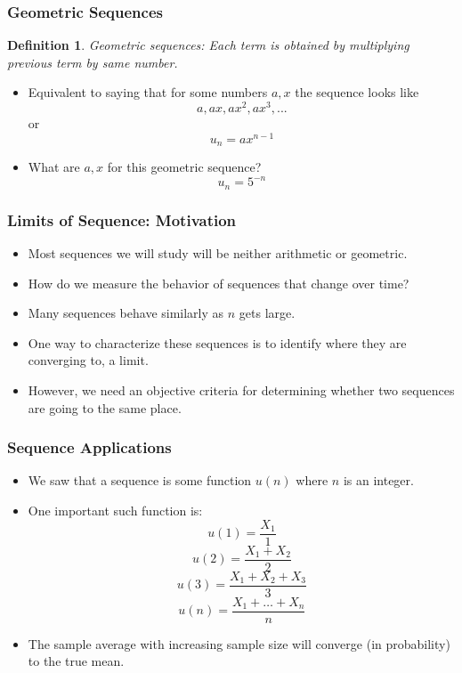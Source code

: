 \documentclass[handout]{beamer}
\newtheorem{defn}{Definition}
\numberwithin{equation}{section}
\begin{document}
\begin{frame}
\frametitle{Geometric Sequences}

\begin{defn}
Geometric sequences: Each term is obtained by multiplying previous term by same number.
\end{defn} \pause

\begin{itemize}
\item Equivalent to saying that for some numbers $a, x$ the sequence looks like $$a, ax, ax^2, ax^3, ...$$ or $$u_n=ax^{n-1}$$ \pause
\item What are $a, x$ for this geometric sequence? $$u_n=5^{-n}$$ 
\end{itemize}

\end{frame}



\begin{frame}
\frametitle{Limits of Sequence: Motivation}

\begin{itemize}
\item Most sequences we will study will be neither arithmetic or geometric.\pause
\item How do we measure the behavior of sequences that change over time?   \pause
\item Many sequences behave similarly as $n$ gets large.
\item One way to characterize these sequences is to identify where they are converging to, a limit.
\item However, we need an objective criteria for determining whether two sequences are going to the same place.
\end{itemize}

\end{frame}




\begin{frame}
\frametitle{Sequence Applications}

\begin{itemize}
\item We saw that a sequence is some function $u(n)$ where $n$ is an integer.\pause
\item One important such function is:
$$u(1)=\frac{X_1}{1}$$\pause
$$u(2)=\frac{X_1+X_2}{2}$$\pause
$$u(3)=\frac{X_1+X_2+X_3}{3}$$\pause
$$u(n)=\frac{X_1+\ldots+X_n}{n}$$\pause

\item The sample average with increasing sample size will converge (in probability) to the true mean.
\end{itemize}

\end{frame}
\end{document}
